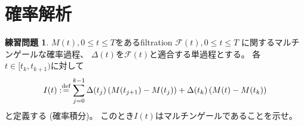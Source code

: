 \documentclass[uplatex]{jsarticle}
\theoremstyle{definition}
\newtheorem{prob}[prob]{練習問題}
\def\mcF{\mathcal{F}}
\def\dfn{:\overset{\mbox{{\scriptsize def}}}{=}}
\begin{document}
\newpage

\section{確率解析}\label{section: 4}


\begin{prob}\label{prob: 4.1}
  \(M(t), 0\leq t\leq T\)をあるfiltration \(\mcF(t), 0\leq t\leq T\)
  に関するマルチンゲールな確率過程、
  \(\Delta(t)\)を\(\mcF(t)\)と適合する単過程とする。
  各\(t\in [t_k,t_{k+1})\)に対して
  \[
  I(t) \dfn
  \sum_{j=0}^{k-1}\Delta(t_j)\left( M(t_{j+1})-M(t_j)\right)
  + \Delta(t_k)\left( M(t)-M(t_k)\right)
  \]
  と定義する (確率積分)。
  このとき\(I(t)\)はマルチンゲールであることを示せ。
\end{prob}
\end{document}
